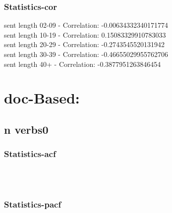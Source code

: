 \documentclass{article}%
\begin{document}
%
\newpage%
\subsubsection{Statistics{-}cor}%
\label{ssubsec:Statistics{-}cor}%
\noindent%
sent length 02-09 - Correlation: -0.00634332340171774\\%
sent length 10-19 - Correlation: 0.15083329910783033\\%
sent length 20-29 - Correlation: -0.2743545520131942\\%
sent length 30-39 - Correlation: -0.46655029955762706\\%
sent length 40+ - Correlation: -0.3877951263846454\\

%
\newpage

%
\section{doc{-}Based:}%
\label{sec:doc{-}Based}%
\subsection{n verbs0}%
\label{subsec:nverbs0}%
\subsubsection{Statistics{-}acf}%
\label{ssubsec:Statistics{-}acf}%


\begin{figure}[ht]%
\centering%
\setlength{\abovecaptionskip}{-35pt}%
%
%
\\%
%
%
\\%
%
\end{figure}

%
\newpage%
\subsubsection{Statistics{-}pacf}%
\label{ssubsec:Statistics{-}pacf}%
\end{document}
